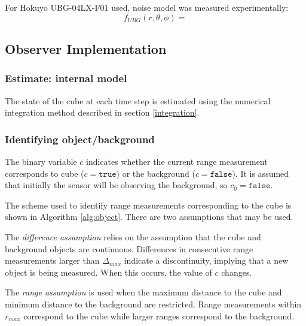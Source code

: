 	For Hokuyo UBG-04LX-F01 used, noise model was measured experimentally:
	\begin{equation}
		f_{UBG}(r,\theta,\phi) = 
	\end{equation}
	
\subsection{Observer Implementation}
	\subsubsection{Estimate: internal model}
		The state of the cube at each time step is estimated using the numerical integration method described in section \ref{integration}.
	
	\subsubsection{Identifying object/background}
		The binary variable $c$ indicates whether the current range measurement corresponds to cube ($c=\texttt{true}$) or the background ($c=\texttt{false}$). It is assumed that initially the sensor will be observing the background, so $c_0=\texttt{false}$.

		The scheme used to identify range measurements corresponding to the cube is shown in Algorithm \ref{alg:object}. There are two assumptions that may be used.
		
		The \textit{difference assumption} relies on the assumption that the cube and background objects are continuous. Differences in consecutive range measurements larger than $\Delta_{max}$ indicate a discontinuity, implying that a new object is being measured. When this occurs, the value of $c$ changes.
		
		The \textit{range assumption} is used when the maximum distance to the cube and minimum distance to the background are restricted. Range measurements within $r_{max}$ correspond to the cube while larger ranges correspond to the background.
		

